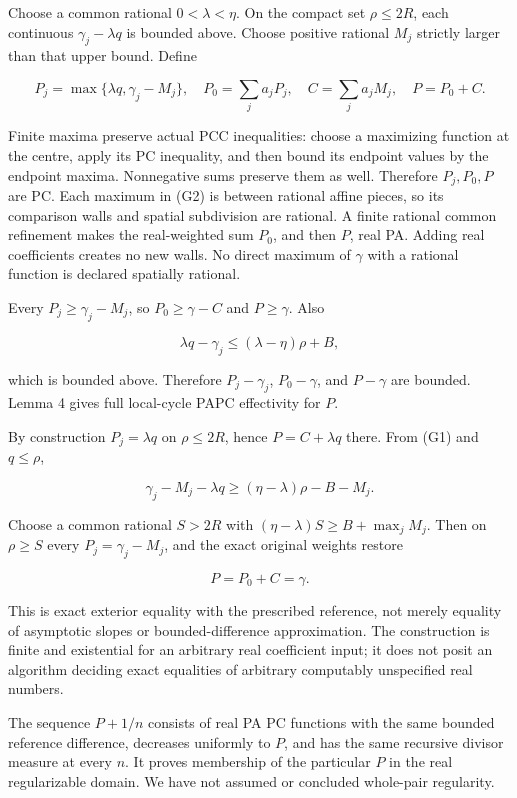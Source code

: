 \documentclass[
  10pt,
]{article}
\begin{document}
Choose a common rational \(0<\lambda<\eta\). On the compact set
\(\rho\leq2R\), each continuous \(\gamma_j-\lambda q\) is bounded above.
Choose positive rational \(M_j\) strictly larger than that upper bound.
Define

\[
P_j=\max\{\lambda q,\gamma_j-M_j\},\quad
P_0=\sum_j a_j P_j,\quad C=\sum_j a_j M_j,\quad P=P_0+C. \tag{G2}
\]

Finite maxima preserve actual PCC inequalities: choose a maximizing
function at the centre, apply its PC inequality, and then bound its
endpoint values by the endpoint maxima. Nonnegative sums preserve them
as well. Therefore \(P_j,P_0,P\) are PC. Each maximum in (G2) is between
rational affine pieces, so its comparison walls and spatial subdivision
are rational. A finite rational common refinement makes the
real-weighted sum \(P_0\), and then \(P\), real PA. Adding real
coefficients creates no new walls. No direct maximum of \(\gamma\) with
a rational function is declared spatially rational.

Every \(P_j\geq\gamma_j-M_j\), so \(P_0\geq\gamma-C\) and
\(P\geq\gamma\). Also

\[
\lambda q-\gamma_j\leq(\lambda-\eta)\rho+B,
\]

which is bounded above. Therefore \(P_j-\gamma_j\), \(P_0-\gamma\), and
\(P-\gamma\) are bounded. Lemma 4 gives full local-cycle PAPC
effectivity for \(P\).

By construction \(P_j=\lambda q\) on \(\rho\leq2R\), hence
\(P=C+\lambda q\) there. From (G1) and \(q\leq\rho\),

\[
\gamma_j-M_j-\lambda q\geq(\eta-\lambda)\rho-B-M_j.
\]

Choose a common rational \(S>2R\) with
\((\eta-\lambda)S\geq B+\max_j M_j\). Then on \(\rho\geq S\) every
\(P_j=\gamma_j-M_j\), and the exact original weights restore

\[
P=P_0+C=\gamma. \tag{G3}
\]

This is exact exterior equality with the prescribed reference, not
merely equality of asymptotic slopes or bounded-difference
approximation. The construction is finite and existential for an
arbitrary real coefficient input; it does not posit an algorithm
deciding exact equalities of arbitrary computably unspecified real
numbers.

The sequence \(P+1/n\) consists of real PA PC functions with the same
bounded reference difference, decreases uniformly to \(P\), and has the
same recursive divisor measure at every \(n\). It proves membership of
the particular \(P\) in the real regularizable domain. We have not
assumed or concluded whole-pair regularity.
\end{document}
